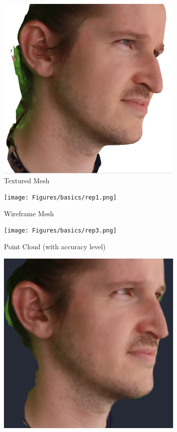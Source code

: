 \begin{figure}
    \centering
    \begin{subfigure}{0.48\linewidth}
        \includegraphics[width=\textwidth]{Figures/basics/rep2.png}
        \caption{Textured Mesh}
    \end{subfigure}
    \begin{subfigure}{0.48\linewidth}
        \texttt{[image: Figures/basics/rep1.png]}
        \caption{Wireframe Mesh}
    \end{subfigure}
    \begin{subfigure}{0.48\linewidth}
        \texttt{[image: Figures/basics/rep3.png]}
        \caption{Point Cloud (with accuracy level)}
    \end{subfigure}
    \begin{subfigure}{0.48\linewidth}
        \includegraphics[width=\textwidth]{Figures/basics/rep5.png}

\end{subfigure}
\end{figure}
